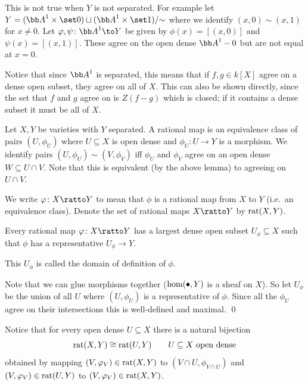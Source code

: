 \eproof

\bnote

    This is not true when $Y$ is not separated.
    For example let $Y=(\bA^1\times\set0)\sqcup(\bA^1\times\set1)/{\sim}$ where we identify $(x,0)\sim(x,1)$ for $x\neq0$.
    Let $\phi,\psi\colon\bA^1\to Y$ be given by $\phi(x)=[(x,0)]$ and $\psi(x)=[(x,1)]$.
    These agree on the open dense $\bA^1-0$ but are not equal at $x=0$.

\enote

Notice that since $\bA^1$ is separated, this means that if $f,g\in k[X]$ agree on a dense open subset, they agree on all of
$X$.
This can also be shown directly, since the set that $f$ and $g$ agree on is $Z(f-g)$ which is closed; if it contains a dense
subset it must be all of $X$.

\bdefn

    Let $X,Y$ be varieties with $Y$ separated.
    A {\emphcolor rational map} is an equivalence class of pairs $(U,\phi_U)$ where $U\subseteq X$ is open dense and
    $\phi_U\colon U\to Y$ is a morphism.
    We identify pairs $(U,\phi_U)\sim(V,\phi_V)$ iff $\phi_U$ and $\phi_V$ agree on an open dense $W\subseteq U\cap V$.
    Note that this is equivalent (by the above lemma) to agreeing on $U\cap V$.

    We write $\phi\colon X\ratto Y$ to mean that $\phi$ is a rational map from $X$ to $Y$ (i.e.\ an equivalence class).
    Denote the set of rational maps $X\ratto Y$ by ${\rm rat}(X,Y)$.

\edefn

\blemm

    Every rational map $\phi\colon X\ratto Y$ has a largest dense open subset $U_\phi\subseteq X$ such that $\phi$
    has a representative $U_\phi\to Y$.

    This $U_\phi$ is called the {\emphcolor domain of definition} of $\phi$.

\elemm

\bproof

    Note that we can glue morphisms together ($\hom(\bullet,Y)$ is a sheaf on $X$).
    So let $U_\phi$ be the union of all $U$ where $(U,\phi_U)$ is a representative of $\phi$.
    Since all the $\phi_U$ agree on their intersections this is well-defined and maximal.
    \qed

\eproof

Notice that for every open dense $U\subseteq X$ there is a natural bijection
$$ {\rm rat}(X,Y) \cong {\rm rat}(U,Y)\qquad\hbox{$U\subseteq X$ open dense} $$
obtained by mapping $(V,\varphi_V)\in{\rm rat}(X,Y)$ to $(V\cap U,\phi_{V\cap U})$ and $(V,\varphi_V)\in{\rm rat}(U,Y)$ to
$(V,\varphi_V)\in{\rm rat}(X,Y)$.

